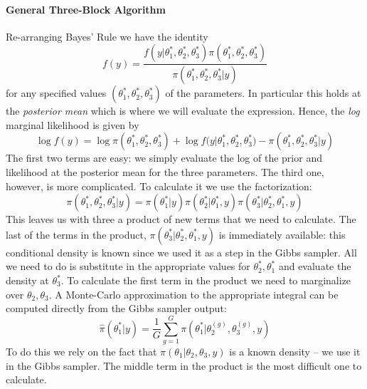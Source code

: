 \documentclass[12pt]{article}
\begin{document}
\paragraph{General Three-Block Algorithm} 
Re-arranging Bayes' Rule we have the identity
\begin{equation*}
f(y) = \frac{f(y|\theta_1^*, \theta^*_2, \theta_3^*)\pi\left( \theta^*_1, \theta^*_2, \theta^*_3 \right)}{\pi\left( \theta_1^*, \theta_2^*, \theta_3^*|y \right)}
\end{equation*}
for any specified values $(\theta_1^*, \theta_2^*, \theta_3^*)$ of the parameters.
In particular this holds at the \emph{posterior mean} which is where we will evaluate the expression.
Hence, the \emph{log} marginal likelihood is given by
\begin{equation*}
\log{f(y)} =  \log \pi\left( \theta^*_1, \theta^*_2, \theta^*_3 \right) + \log{f(y|\theta^*_1, \theta^*_2, \theta^*_3}) - \pi\left( \theta^*_1, \theta^*_2, \theta^*_3|y \right)
\end{equation*}
The first two terms are easy: we simply evaluate the log of the prior and likelihood at the posterior mean for the three parameters.
The third one, however, is more complicated.
To calculate it we use the factorization:
\begin{equation*}
\pi\left( \theta^*_1, \theta^*_2, \theta^*_3|y \right) = \pi(\theta^*_1|y) \pi\left( \theta^*_2|\theta^*_1,y \right)\pi\left( \theta^*_3|\theta^*_2, \theta^*_1,y \right)
\end{equation*}
This leaves us with three a product of new terms that we need to calculate.
The last of the terms in the product, $\pi(\theta^*_3|\theta^*_2, \theta^*_1, y)$ is immediately available: this conditional density is known since we used it as a step in the Gibbs sampler.
All we need to do is substitute in the appropriate values for $\theta^*_2,\theta^*_1$ and evaluate the density at $\theta^*_3$.
To calculate the first term in the product we need to marginalize over $\theta_2, \theta_3$.
A Monte-Carlo approximation to the appropriate integral can be computed directly from the Gibbs sampler output:
\begin{equation*}
\widehat{\pi}\left( \theta^*_1|y \right) = \frac{1}{G}\sum_{g=1}^{G} \pi\left( \theta^*_1|\theta_2^{(g)}, \theta_3^{(g)}, y \right)
\end{equation*}
To do this we rely on the fact that $\pi(\theta_1|\theta_2, \theta_3, y)$ is a known density -- we use it in the Gibbs sampler.
The middle term in the product is the most difficult one to calculate.
\end{document}
